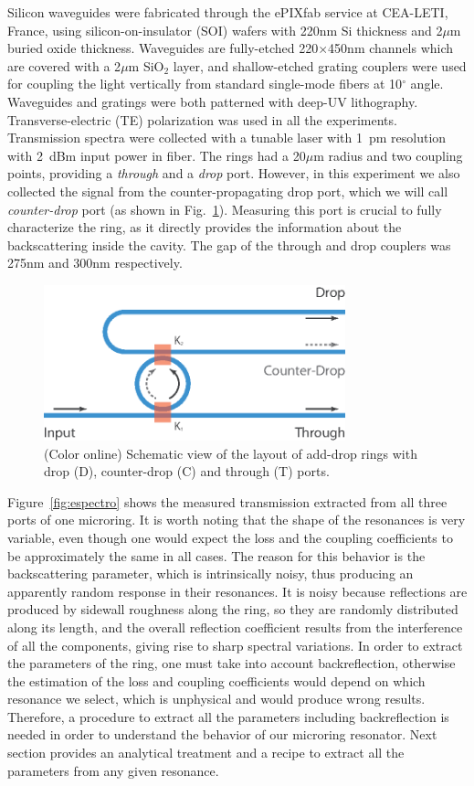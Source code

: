 \documentclass[10pt,letterpaper]{article}
\begin{document}
Silicon waveguides were fabricated through the ePIXfab service at CEA-LETI, France, using silicon-on-insulator (SOI) wafers with 220nm Si thickness and 2$\mu$m buried oxide thickness. Waveguides are fully-etched 220$\times$450nm channels which are covered with a 2$\mu$m SiO$_2$ layer, and shallow-etched grating couplers were used for coupling the light vertically from standard single-mode fibers at 10$^\circ$ angle. Waveguides and gratings were both patterned with deep-UV lithography. Transverse-electric (TE) polarization was used in all the experiments. Transmission spectra were collected with a tunable laser with 1~pm resolution with 2~dBm input power in fiber. The rings had a 20$\mu$m radius and two coupling points, providing a \emph{through} and a  \emph{drop} port. However, in this experiment we also collected the signal from the counter-propagating drop port, which we will call \emph{counter-drop} port (as shown in Fig.~\ref{fig:add_drop_ring}). Measuring this port is crucial to fully characterize the ring, as it directly provides the information about the backscattering inside the cavity. The gap of the through and drop couplers was 275nm and 300nm respectively. 
\begin{figure}
    \centering
    \includegraphics[height=4.5cm]{add_drop_ring.eps}
    \caption{(Color online) Schematic view of the layout of add-drop rings with drop (D), counter-drop (C) and through (T) ports.}
    \label{fig:add_drop_ring}
\end{figure}

Figure~\ref{fig:espectro} shows the measured transmission extracted from all three ports of one microring. It is worth noting that the shape of the resonances is very variable, even though one would expect the loss and the coupling coefficients to be approximately the same in all cases. The reason for this behavior is the backscattering parameter, which is intrinsically noisy, thus producing an apparently random response in their resonances. It is noisy because reflections are produced by sidewall roughness along the ring, so they are randomly distributed along its length, and the overall reflection coefficient results from the interference of all the components, giving rise to sharp spectral variations. In order to extract the parameters of the ring, one must take into account backreflection, otherwise the estimation of the loss and coupling coefficients would depend on which resonance we select, which is unphysical and would produce wrong results. Therefore, a procedure to extract all the parameters including backreflection is needed in order to understand the behavior of our microring resonator. Next section provides an analytical treatment and a recipe to extract all the parameters from any given resonance.
\end{document}
